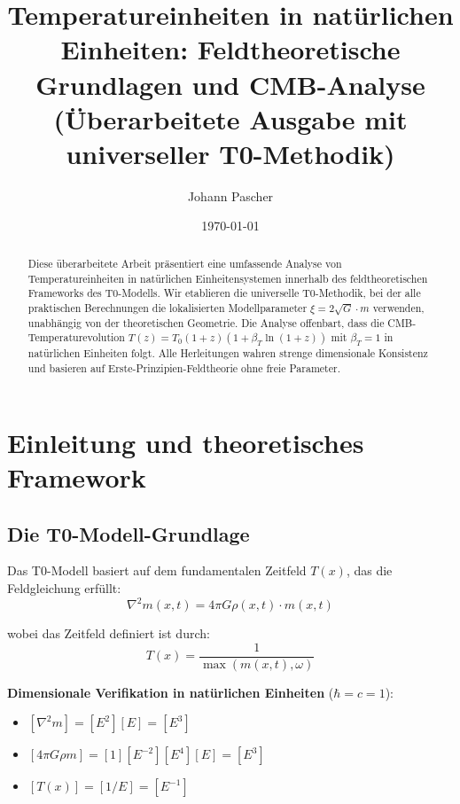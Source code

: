 \documentclass[12pt,a4paper]{article}
\newcommand{\Tfield}{T(x)}
\begin{document}
	
	\title{Temperatureinheiten in natürlichen Einheiten: Feldtheoretische Grundlagen und CMB-Analyse \\
		(Überarbeitete Ausgabe mit universeller T0-Methodik)}
	\author{Johann Pascher}
	\date{\today}
	
	\maketitle
	
	\begin{abstract}
		Diese überarbeitete Arbeit präsentiert eine umfassende Analyse von Temperatureinheiten in natürlichen Einheitensystemen innerhalb des feldtheoretischen Frameworks des T0-Modells. Wir etablieren die universelle T0-Methodik, bei der alle praktischen Berechnungen die lokalisierten Modellparameter $\xi = 2\sqrt{G} \cdot m$ verwenden, unabhängig von der theoretischen Geometrie. Die Analyse offenbart, dass die CMB-Temperaturevolution $T(z) = T_0(1+z)(1 + \beta_T \ln(1+z))$ mit $\beta_T = 1$ in natürlichen Einheiten folgt. Alle Herleitungen wahren strenge dimensionale Konsistenz und basieren auf Erste-Prinzipien-Feldtheorie ohne freie Parameter.
	\end{abstract}
	
	\tableofcontents
	\newpage
	
	\section{Einleitung und theoretisches Framework}
	\label{sec:einleitung}
	
	\subsection{Die T0-Modell-Grundlage}
	\label{subsec:t0_grundlage}
	
	Das T0-Modell basiert auf dem fundamentalen Zeitfeld $\Tfield$, das die Feldgleichung erfüllt:
	\begin{equation}
		\nabla^2 m(x,t) = 4\pi G \rho(x,t) \cdot m(x,t)
	\end{equation}
	
	wobei das Zeitfeld definiert ist durch:
	\begin{equation}
		\Tfield = \frac{1}{\max(m(x,t), \omega)}
	\end{equation}
	
	\textbf{Dimensionale Verifikation in natürlichen Einheiten} ($\hbar = c = 1$):
	\begin{itemize}
		\item $[\nabla^2 m] = [E^2][E] = [E^3]$
		\item $[4\pi G \rho m] = [1][E^{-2}][E^4][E] = [E^3]$ \checkmark
		\item $[\Tfield] = [1/E] = [E^{-1}]$ \checkmark
	\end{itemize}
	
\end{document}
